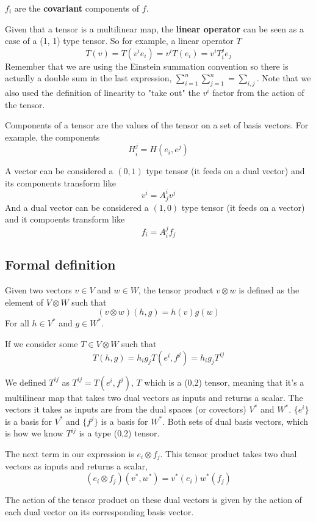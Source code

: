$f_i$ are the \textbf{covariant} components of $f$.

Given that a tensor is a multilinear map, the \textbf{linear operator}
can be seen as a case of a (1, 1) type tensor.
So for example, a linear operator $T$
$$
T(v)
= T(v^i e_i)
= v^i T(e_i)
= v^i T_{i}^{j} e_j
$$
Remember that we are using the Einstein summation convention so there is actually a double sum in the last
expression, $\sum_{i=1}^{n} \sum_{j=1}^{n} = \sum_{i,j}$.
Note that we also used the definition of linearity to "take out" the $v^i$ factor from the action of the
tensor.

Components of a tensor are the values of the tensor on a set of basis vectors.
For example, the components
$$
H_{i}^{j} = H(e_i, e^j)
$$

A vector can be considered a $(0, 1)$ type tensor (it feeds on a dual vector)
and its components transform like
$$
v^i = A_{j}^{i} v^j
$$
And a dual vector can be considered a $(1, 0)$ type tensor (it feeds on a vector)
and it compoents transform like
$$
f_i = A_{i}^{j} f_j
$$


\subsection{Formal definition}

Given two vectors $v \in V$ and $w \in W$,
the tensor product $v \otimes w$ is defined as the element of $V \otimes W$ such that
$$
(v \otimes w)(h, g) = h(v) g(w)
$$
For all $h \in V^*$ and $g \in W^*$.

If we consider some $T \in V \otimes W$ such that
$$
T(h, g) = h_i g_j T(e^i, f^j) = h_i g_j T^{i j}
$$


We defined $T^{i j}$ as $T^{i j} = T(e^i, f^j)$, $T$ which is a (0,2) tensor,
meaning that it's a multilinear map that takes two dual vectors as inputs and returns a scalar.
The vectors it takes as inputs are from the dual spaces (or covectors) $V^*$ and $W^*$.
$\{e^i\}$ is a basis for $V^*$ and $\{f^j\}$ is a basis for $W^*$.
Both sets of dual basis vectors, which is how we know $T^{ij}$ is a type (0,2) tensor.



The next term in our expression is $e_i \otimes f_j$.
This tensor product takes two dual vectors as inputs and returns a scalar,
$$
(e_i \otimes f_j)(v^*, w^*) = v^*(e_i) w^*(f_j)
$$

The action of the tensor product on these dual vectors is given by the action of each dual vector on its
corresponding basis vector.

